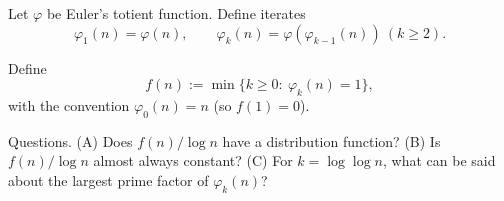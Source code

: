 Let $\varphi$ be Euler's totient function. Define iterates
\[
\varphi_1(n)=\varphi(n),\qquad \varphi_{k}(n)=\varphi(\varphi_{k-1}(n))\ (k\ge 2).
\]

Define
\[
 f(n):=\min\{k\ge 0:\ \varphi_k(n)=1\},
\]
with the convention $\varphi_0(n)=n$ (so $f(1)=0$).

Questions.
(A) Does $f(n)/\log n$ have a distribution function?
(B) Is $f(n)/\log n$ almost always constant?
(C) For $k=\log\log n$, what can be said about the largest prime factor of $\varphi_k(n)$?
